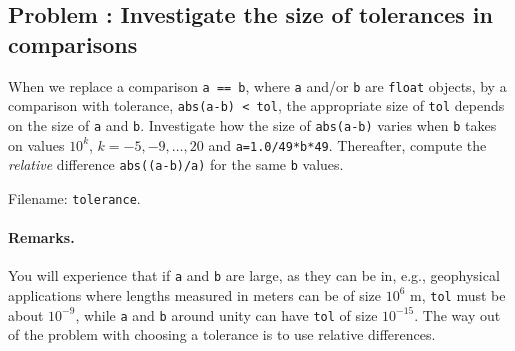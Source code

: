 \documentclass[graybox,sectrefs,envcountresetchap,open=right,final]{svmonodo}
\newenvironment{doconceexercise}{}{}
\newcounter{doconceexercisecounter}
\begin{document}
\begin{doconceexercise}

\subsection*{Problem \thedoconceexercisecounter: Investigate the size of tolerances in comparisons}

\label{softeng1:exer:tol}


When we replace a comparison \texttt{a == b}, where \texttt{a} and/or \texttt{b} are
\texttt{float} objects, by a comparison with tolerance, \texttt{abs(a-b) < tol},
the appropriate size of \texttt{tol} depends on the size of \texttt{a} and \texttt{b}.
Investigate how the size of \texttt{abs(a-b)} varies when \texttt{b} takes on
values $10^k$, $k=-5,-9,\ldots,20$ and \texttt{a=1.0/49*b*49}.
Thereafter, compute the \emph{relative} difference \texttt{abs((a-b)/a)} for
the same \texttt{b} values.


\noindent Filename: \texttt{tolerance}.


\paragraph{Remarks.}
You will experience that if \texttt{a} and \texttt{b} are large, as they can be
in, e.g.,
geophysical applications where lengths measured in meters can be of size
$10^6$ m, \texttt{tol} must be about $10^{-9}$, while \texttt{a} and \texttt{b} around unity can
have \texttt{tol} of size $10^{-15}$.
The way out of the problem with choosing a tolerance is to use
relative differences.


\end{doconceexercise}
\end{document}
